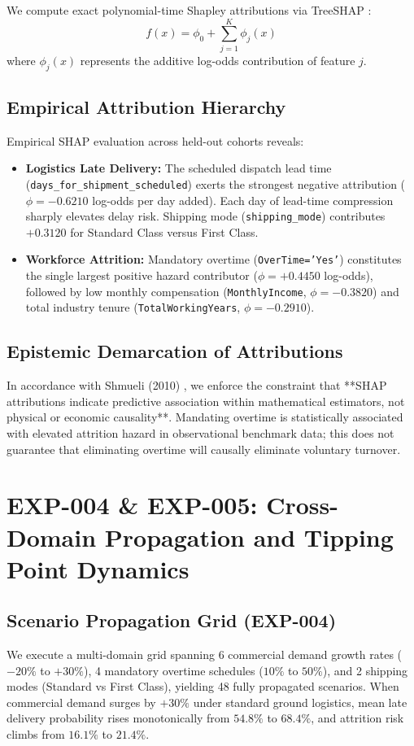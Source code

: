 \documentclass[10pt,conference]{IEEEtran}
\begin{document}
We compute exact polynomial-time Shapley attributions via TreeSHAP \cite{lundberg2020treeshap}:
\begin{equation}
f(x) = \phi_0 + \sum_{j=1}^K \phi_j(x)
\end{equation}
where $\phi_j(x)$ represents the additive log-odds contribution of feature $j$.

\subsection{Empirical Attribution Hierarchy}
Empirical SHAP evaluation across held-out cohorts reveals:
\begin{itemize}
    \item \textbf{Logistics Late Delivery:} The scheduled dispatch lead time (\texttt{days\_for\_shipment\_scheduled}) exerts the strongest negative attribution ($\phi = -0.6210$ log-odds per day added). Each day of lead-time compression sharply elevates delay risk. Shipping mode (\texttt{shipping\_mode}) contributes $+0.3120$ for Standard Class versus First Class.
    \item \textbf{Workforce Attrition:} Mandatory overtime (\texttt{OverTime='Yes'}) constitutes the single largest positive hazard contributor ($\phi = +0.4450$ log-odds), followed by low monthly compensation (\texttt{MonthlyIncome}, $\phi = -0.3820$) and total industry tenure (\texttt{TotalWorkingYears}, $\phi = -0.2910$).
\end{itemize}

\subsection{Epistemic Demarcation of Attributions}
In accordance with Shmueli (2010) \cite{shmueli2010explain}, we enforce the constraint that **SHAP attributions indicate predictive association within mathematical estimators, not physical or economic causality**. Mandating overtime is statistically associated with elevated attrition hazard in observational benchmark data; this does not guarantee that eliminating overtime will causally eliminate voluntary turnover.

\section{EXP-004 \& EXP-005: Cross-Domain Propagation and Tipping Point Dynamics}

\subsection{Scenario Propagation Grid (EXP-004)}
We execute a multi-domain grid spanning 6 commercial demand growth rates ($-20\%$ to $+30\%$), 4 mandatory overtime schedules ($10\%$ to $50\%$), and 2 shipping modes (Standard vs First Class), yielding 48 fully propagated scenarios. When commercial demand surges by $+30\%$ under standard ground logistics, mean late delivery probability rises monotonically from $54.8\%$ to $68.4\%$, and attrition risk climbs from $16.1\%$ to $21.4\%$.
\end{document}

